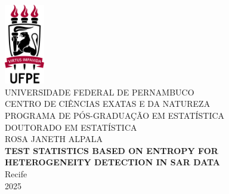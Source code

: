 \documentclass[
  letterpaper,
  11pt,
  english,
  doublespacing,
  headsepline,
  consistentlayout,
  oneside,
  openany]{MastersDoctoralThesis}
\author{Jane
Doe} %
\begin{document}
 \makeatletter
\renewcommand{\cleardoublepage}{\clearpage} %
\makeatother

\frontmatter %

\pagestyle{plain} %



\begin{titlepage}
  \begin{center}
  
									\includegraphics[height=3.5cm]{images/ufpe-logo.png} %
						\\[0.3cm]
    
    {\large\MakeUppercase{UNIVERSIDADE FEDERAL DE PERNAMBUCO}}\\
    {\large\MakeUppercase{CENTRO DE CIÊNCIAS EXATAS E DA NATUREZA}}\\
    {\large\MakeUppercase{PROGRAMA DE PÓS-GRADUAÇÃO EM ESTATÍSTICA}}\\
    {\large\MakeUppercase{DOUTORADO EM ESTATÍSTICA}}\\[4cm]
		
    {\large ROSA JANETH ALPALA}\\[3cm]
    
    {\Large \textbf{TEST STATISTICS BASED ON ENTROPY FOR HETEROGENEITY DETECTION IN SAR DATA}}\\[6cm]
    

		
%
   {\large Recife}\\
   {\large 2025}
    
  \end{center}
\end{titlepage}
\end{document}

